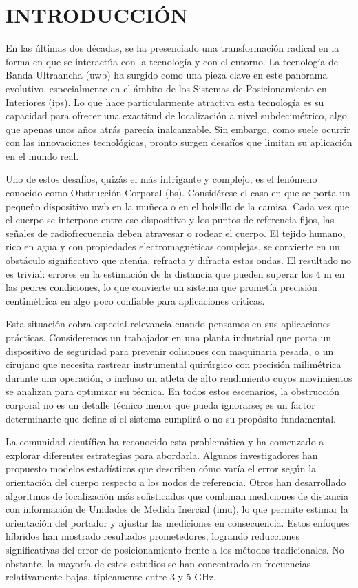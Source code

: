 \chapter{INTRODUCCIÓN}
\label{ch:introduccion}

En las últimas dos décadas, se ha presenciado una transformación radical en la forma en que se interactúa con la tecnología y con el entorno. La tecnología de Banda Ultraancha (\gls{uwb}) ha surgido como una pieza clave en este panorama evolutivo, especialmente en el ámbito de los Sistemas de Posicionamiento en Interiores (\gls{ips}). Lo que hace particularmente atractiva esta tecnología es su capacidad para ofrecer una exactitud de localización a nivel subdecimétrico, algo que apenas unos años atrás parecía inalcanzable. Sin embargo, como suele ocurrir con las innovaciones tecnológicas, pronto surgen desafíos que limitan su aplicación en el mundo real.

Uno de estos desafíos, quizás el más intrigante y complejo, es el fenómeno conocido como Obstrucción Corporal (\gls{bs}). Considérese el caso en que se porta un pequeño dispositivo \gls{uwb} en la muñeca o en el bolsillo de la camisa. Cada vez que el cuerpo se interpone entre ese dispositivo y los puntos de referencia fijos, las señales de radiofrecuencia deben atravesar o rodear el cuerpo. El tejido humano, rico en agua y con propiedades electromagnéticas complejas, se convierte en un obstáculo significativo que atenúa, refracta y difracta estas ondas. El resultado no es trivial: errores en la estimación de la distancia que pueden superar los 4 m en las peores condiciones, lo que convierte un sistema que prometía precisión centimétrica en algo poco confiable para aplicaciones críticas.

Esta situación cobra especial relevancia cuando pensamos en sus aplicaciones prácticas. Consideremos un trabajador en una planta industrial que porta un dispositivo de seguridad para prevenir colisiones con maquinaria pesada, o un cirujano que necesita rastrear instrumental quirúrgico con precisión milimétrica durante una operación, o incluso un atleta de alto rendimiento cuyos movimientos se analizan para optimizar su técnica. En todos estos escenarios, la obstrucción corporal no es un detalle técnico menor que pueda ignorarse; es un factor determinante que define si el sistema cumplirá o no su propósito fundamental.

La comunidad científica ha reconocido esta problemática y ha comenzado a explorar diferentes estrategias para abordarla. Algunos investigadores han propuesto modelos estadísticos que describen cómo varía el error según la orientación del cuerpo respecto a los nodos de referencia. Otros han desarrollado algoritmos de localización más sofisticados que combinan mediciones de distancia con información de Unidades de Medida Inercial (\gls{imu}), lo que permite estimar la orientación del portador y ajustar las mediciones en consecuencia. Estos enfoques híbridos han mostrado resultados prometedores, logrando reducciones significativas del error de posicionamiento frente a los métodos tradicionales. No obstante, la mayoría de estos estudios se han concentrado en frecuencias relativamente bajas, típicamente entre 3 y 5 GHz.

